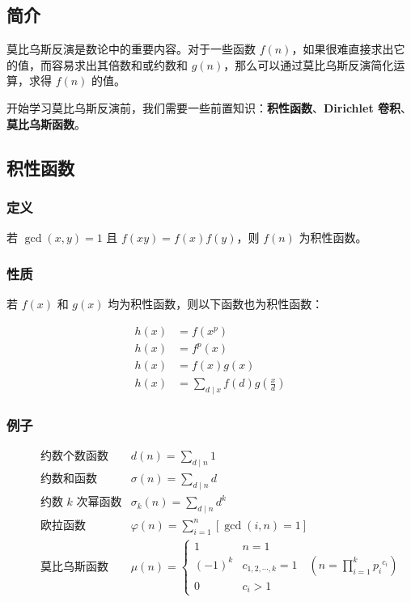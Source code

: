 
\subsection{简介}

莫比乌斯反演是数论中的重要内容。对于一些函数 $f(n)$，如果很难直接求出它的值，而容易求出其倍数和或约数和 $g(n)$，那么可以通过莫比乌斯反演简化运算，求得 $f(n)$ 的值。

开始学习莫比乌斯反演前，我们需要一些前置知识：\textbf{积性函数}、\textbf{Dirichlet 卷积}、\textbf{莫比乌斯函数}。

\hr

\subsection{积性函数}

\subsubsection{定义}

若 $\gcd(x,y)=1$ 且 $f(xy)=f(x)f(y)$，则 $f(n)$ 为积性函数。

\subsubsection{性质}

若 $f(x)$ 和 $g(x)$ 均为积性函数，则以下函数也为积性函数：

$$
\begin{aligned}
h(x)&=f(x^p)\\
h(x)&=f^p(x)\\
h(x)&=f(x)g(x)\\
h(x)&=\sum_{d\mid x}f(d)g(\frac{x}{d})
\end{aligned}
$$

\subsubsection{例子}

$$
\qquad\begin{aligned}
\text{约数个数函数}&d(n)=\displaystyle\sum_{d\mid n}1\\
\text{约数和函数}&\displaystyle\sigma(n)=\sum_{d\mid n}d\\
\text{约数 $k$ 次幂函数}&\displaystyle\sigma_k(n)=\sum_{d\mid n}d^k\\
\text{欧拉函数}&\displaystyle\varphi(n)=\sum_{i=1}^n [\gcd(i,n)=1]\\
\text{莫比乌斯函数}&\displaystyle\mu(n)=
\begin{cases}
1 & n=1\\
(-1)^k &c_{1,2,\cdots,k}=1\quad(n=\displaystyle\prod_{i=1}^k {p_i}^{c_i})\\
0 & c_i>1
\end{cases}
\end{aligned}
$$

